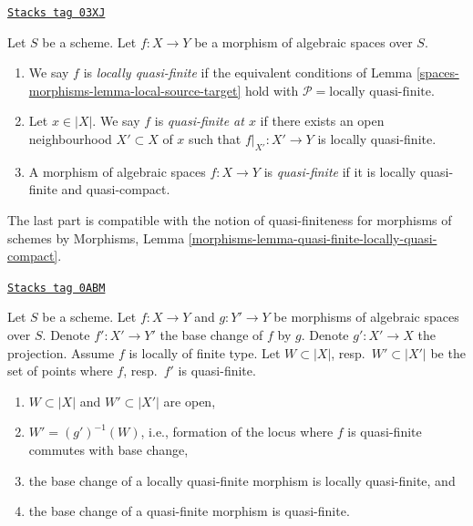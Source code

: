 \begin{definition}
\label{spaces-morphisms-definition-locally-quasi-finite}
\href{https://stacks.math.columbia.edu/tag/03XJ}{\texttt{Stacks tag 03XJ}}

Let $S$ be a scheme.
Let $f : X \to Y$ be a morphism of algebraic spaces over $S$.
\begin{enumerate}
\item We say $f$ is
{\it locally quasi-finite} if the equivalent conditions of
Lemma \ref{spaces-morphisms-lemma-local-source-target} hold with
$\mathcal{P} = \text{locally quasi-finite}$.
\item Let $x \in |X|$. We say $f$ is {\it quasi-finite at $x$}
if there exists an open neighbourhood $X' \subset X$ of $x$ such
that $f|_{X'} : X' \to Y$ is locally quasi-finite.
\item A morphism of algebraic spaces $f : X \to Y$ is
{\it quasi-finite} if it is locally quasi-finite and quasi-compact.
\end{enumerate}
\end{definition}

The last part is compatible with the notion of quasi-finiteness for morphisms
of schemes by
Morphisms, Lemma \ref{morphisms-lemma-quasi-finite-locally-quasi-compact}.

\begin{lemma}
\label{spaces-morphisms-lemma-base-change-quasi-finite-locus}
\href{https://stacks.math.columbia.edu/tag/0ABM}{\texttt{Stacks tag 0ABM}}

Let $S$ be a scheme. Let $f : X \to Y$ and $g : Y' \to Y$ be morphisms
of algebraic spaces over $S$. Denote $f' : X' \to Y'$ the base change
of $f$ by $g$. Denote $g' : X' \to X$ the projection.
Assume $f$ is locally of finite type.
Let $W \subset |X|$, resp.\ $W' \subset |X'|$
be the set of points where $f$, resp.\ $f'$ is quasi-finite.
\begin{enumerate}
\item $W \subset |X|$ and $W' \subset |X'|$ are open,
\item $W' = (g')^{-1}(W)$, i.e., formation of the locus where
$f$ is quasi-finite commutes with base change,
\item the base change of a locally quasi-finite morphism is
locally quasi-finite, and
\item the base change of a quasi-finite morphism is quasi-finite.
\end{enumerate}
\end{lemma}

